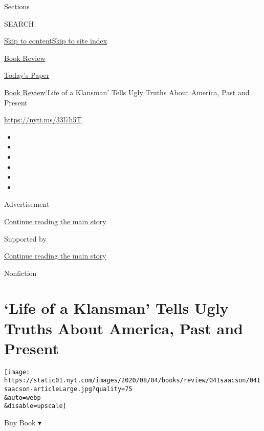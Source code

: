 Sections

SEARCH

\protect\hyperlink{site-content}{Skip to
content}\protect\hyperlink{site-index}{Skip to site index}

\href{https://www.nytimes.com/section/books/review}{Book Review}

\href{https://myaccount.nytimes.com/auth/login?response_type=cookie\&client_id=vi}{}

\href{https://www.nytimes.com/section/todayspaper}{Today's Paper}

\href{/section/books/review}{Book Review}\textbar{}`Life of a Klansman'
Tells Ugly Truths About America, Past and Present

\url{https://nyti.ms/33l7h5T}

\begin{itemize}
\item
\item
\item
\item
\item
\item
\end{itemize}

Advertisement

\protect\hyperlink{after-top}{Continue reading the main story}

Supported by

\protect\hyperlink{after-sponsor}{Continue reading the main story}

Nonfiction

\hypertarget{life-of-a-klansman-tells-ugly-truths-about-america-past-and-present}{%
\section{`Life of a Klansman' Tells Ugly Truths About America, Past and
Present}\label{life-of-a-klansman-tells-ugly-truths-about-america-past-and-present}}

\texttt{[image: https://static01.nyt.com/images/2020/08/04/books/review/04Isaacson/04Isaacson-articleLarge.jpg?quality=75\\\&auto=webp\\\&disable=upscale]}

Buy Book ▾

